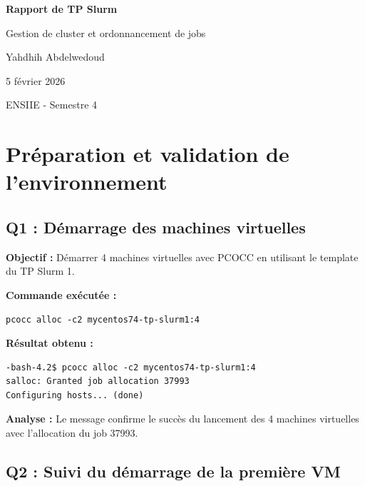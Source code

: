 \documentclass[12pt,a4paper]{article}
\begin{document}
\begin{titlepage}
    \centering
    \vspace*{2cm}
    {\Huge\bfseries Rapport de TP Slurm\par}
    \vspace{1cm}
    {\Large Gestion de cluster et ordonnancement de jobs\par}
    \vspace{2cm}
    {\large Yahdhih Abdelwedoud\par}
    \vspace{1cm}
    {\large 5 février 2026\par}
    \vfill
    {\large ENSIIE - Semestre 4\par}
\end{titlepage}

\tableofcontents
\newpage

\section{Préparation et validation de l'environnement}

\subsection{Q1 : Démarrage des machines virtuelles}

\textbf{Objectif :} Démarrer 4 machines virtuelles avec PCOCC en utilisant le template du TP Slurm 1.

\textbf{Commande exécutée :}
\begin{lstlisting}
pcocc alloc -c2 mycentos74-tp-slurm1:4
\end{lstlisting}

\textbf{Résultat obtenu :}
\begin{lstlisting}
-bash-4.2$ pcocc alloc -c2 mycentos74-tp-slurm1:4
salloc: Granted job allocation 37993
Configuring hosts... (done)
\end{lstlisting}

\textbf{Analyse :} Le message confirme le succès du lancement des 4 machines virtuelles avec l'allocation du job 37993.

\subsection{Q2 : Suivi du démarrage de la première VM}
\end{document}

